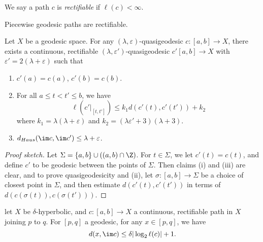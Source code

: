 \documentclass[a4paper]{article}
\begin{document}
\begin{defi}
  We say a path $c$ is \emph{rectifiable} if $\ell(c) < \infty$.
\end{defi}

\begin{eg}
  Piecewise geodesic paths are rectifiable.
\end{eg}

\begin{lemma}
  Let $X$ be a geodesic space. For any $(\lambda, \varepsilon)$-quasigeodesic $c: [a, b] \to X$, there exists a continuous, rectifiable $(\lambda, \varepsilon')$-quasigeodesic $c'[a, b] \to X$ with $\varepsilon' = 2(\lambda + \varepsilon)$ such that
  \begin{enumerate}
    \item $c'(a) = c(a)$, $c'(b) = c(b)$.
    \item For all $a \leq t < t' \leq b$, we have
      \[
        \ell(c'|_{[t, t']}) \leq k_1 d(c'(t), c'(t')) + k_2
      \]
      where $k_1 = \lambda (\lambda + \varepsilon)$ and $k_2 = (\lambda \varepsilon' + 3)(\lambda + 3)$.
    \item $d_{Haus}(\im c, \im c') \leq \lambda + \varepsilon$.
  \end{enumerate}
\end{lemma}

\begin{proof}[Proof sketch]
  Let $\Sigma = \{a, b\} \cup ((a, b) \cap \Z)$. For $t \in \Sigma$, we let $c'(t) = c(t)$, and define $c'$ to be geodesic between the points of $\Sigma$. Then claims (i) and (iii) are clear, and to prove quasigeodesicity and (ii), let $\sigma: [a, b] \to \Sigma$ be a choice of closest point in $\Sigma$, and then estimate $d(c'(t), c'(t'))$ in terms of $d(c(\sigma(t)), c(\sigma(t')))$.
\end{proof}

\begin{lemma}
  let $X$ be $\delta$-hyperbolic, and $c: [a, b] \to X$ a continuous, rectifiable path in $X$ joining $p$ to $q$. For $[p, q]$ a geodesic, for any $x \in [p, q]$, we have
  \[
    d(x, \im c) \leq \delta |\log_2\ell(c)| + 1.
  \]
\end{lemma}
\end{document}
